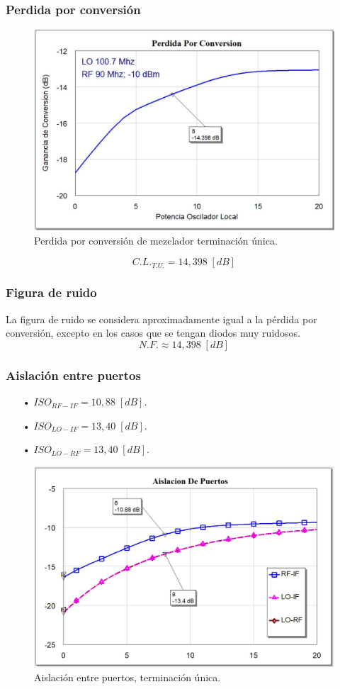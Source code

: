 \documentclass[twocolumn]{article}
\begin{document}
\subsubsection{Perdida por conversión}
%
\begin{figure}[h]
  \centering    
	\includegraphics[width=\columnwidth]{imagenes/CL1.jpg}
	\caption{Perdida por conversión de mezclador terminación única.}\label{fig:CL1}
\end{figure}
\[C.L._{T.U.} = 14,398 \; [dB] \]
%
\subsubsection{Figura de ruido}
%
La figura de ruido se considera aproximadamente igual a la pérdida por conversión, excepto en los casos que se tengan diodos muy ruidosos.
\[N.F. \approx 14,398 \; [dB] \]
%
\subsubsection{Aislación entre puertos}
%
\begin{itemize}\itemsep0em
\item[•]  $ISO_{RF-IF} = 10,88 \; [dB]$.
\item[•]  $ISO_{LO-IF} = 13,40 \; [dB]$.
\item[•]  $ISO_{LO-RF} = 13,40 \; [dB]$.
\end{itemize}
%
\begin{figure}[h]
  \centering    
	\includegraphics[width=\columnwidth]{imagenes/ISO1.jpg}
	\caption{Aislación entre puertos, terminación única.}\label{fig:ISO1}
\end{figure}
\clearpage
%
\end{document}
